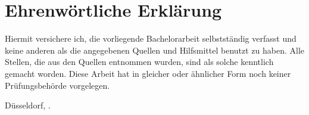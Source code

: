 \chapter*{Ehrenwörtliche Erklärung}

Hiermit versichere ich, die vorliegende Bachelorarbeit selbstständig 
verfasst und keine anderen als die angegebenen Quellen und Hilfsmittel
benutzt zu haben.
Alle Stellen, die aus den Quellen entnommen
wurden, sind als solche kenntlich gemacht worden. Diese Arbeit hat in
gleicher oder ähnlicher Form noch keiner Prüfungsbehörde vorgelegen.

\vspace{3cm}

\noindent Düsseldorf, \thesissubmissionday{}.\thesissubmissionmonth{} \thesissubmissionyear{} \hfill \thesisauthor{}
